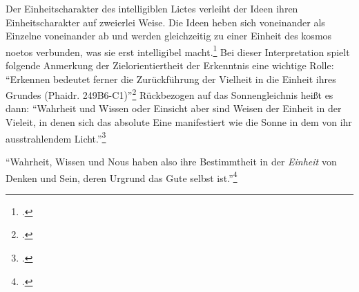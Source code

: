Der Einheitscharakter des intelligiblen Lictes verleiht der Ideen ihren Einheitscharakter auf zweierlei Weise. Die Ideen heben sich voneinander als Einzelne voneinander ab und werden gleichzeitig zu einer Einheit des kosmos noetos verbunden, was sie erst intelligibel macht.\footcite[vgl.][S. 252]{halfwassenaufstieg2006}
Bei dieser Interpretation spielt folgende Anmerkung der Zielorientiertheit der Erkenntnis eine wichtige Rolle:
\enquote{Erkennen bedeutet ferner die Zurückführung der Vielheit in die Einheit ihres Grundes (Phaidr. 249B6-C1)}\footcite[][S. 252]{halfwassenaufstieg2006}
Rückbezogen auf das Sonnengleichnis heißt es dann:
\enquote{Wahrheit und Wissen oder Einsicht aber sind Weisen der Einheit in der Vieleit, in denen sich das absolute Eine manifestiert wie die Sonne in dem von ihr ausstrahlendem Licht.}\footcite[][S. 252]{halfwassenaufstieg2006}

\enquote{Wahrheit, Wissen und Nous haben also ihre Bestimmtheit in der \emph{Einheit} von Denken und Sein, deren Urgrund das Gute selbst ist.}\footcite[][S. 257]{halfwassenaufstieg2006}


